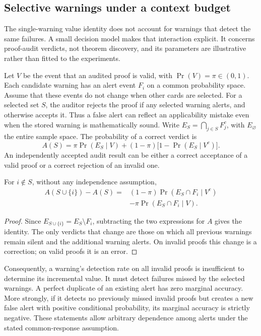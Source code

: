 \subsection{Selective warnings under a context budget}
\label{sec:warningbudget}

The single-warning value identity does not account for warnings that detect the same failures. A small decision model makes that interaction explicit. It concerns proof-audit verdicts, not theorem discovery, and its parameters are illustrative rather than fitted to the experiments.

Let $V$ be the event that an audited proof is valid, with $\Pr(V)=\pi\in(0,1)$. Each candidate warning has an alert event $F_i$ on a common probability space. Assume that these events do not change when other cards are selected. For a selected set $S$, the auditor rejects the proof if any selected warning alerts, and otherwise accepts it. Thus a false alert can reflect an applicability mistake even when the stored warning is mathematically sound. Write $E_S=\bigcap_{j\in S}F_j^c$, with $E_\varnothing$ the entire sample space. The probability of a correct verdict is
\[
 A(S)=\pi\Pr(E_S\mid V)
 +(1-\pi)\bigl[1-\Pr(E_S\mid V^c)\bigr].
\]
An independently accepted audit result can be either a correct acceptance of a valid proof or a correct rejection of an invalid one.

\begin{proposition}
For $i\notin S$, without any independence assumption,
\begin{align*}
 A(S\cup\{i\})-A(S)
 ={}&(1-\pi)\Pr(E_S\cap F_i\mid V^c)\\
 &-\pi\Pr(E_S\cap F_i\mid V).
\end{align*}
\end{proposition}
\begin{proof}
Since $E_{S\cup\{i\}}=E_S\setminus F_i$, subtracting the two expressions for $A$ gives the identity. The only verdicts that change are those on which all previous warnings remain silent and the additional warning alerts. On invalid proofs this change is a correction; on valid proofs it is an error.
\end{proof}

Consequently, a warning's detection rate on all invalid proofs is insufficient to determine its incremental value. It must detect failures missed by the selected warnings. A perfect duplicate of an existing alert has zero marginal accuracy. More strongly, if it detects no previously missed invalid proofs but creates a new false alert with positive conditional probability, its marginal accuracy is strictly negative. These statements allow arbitrary dependence among alerts under the stated common-response assumption.


